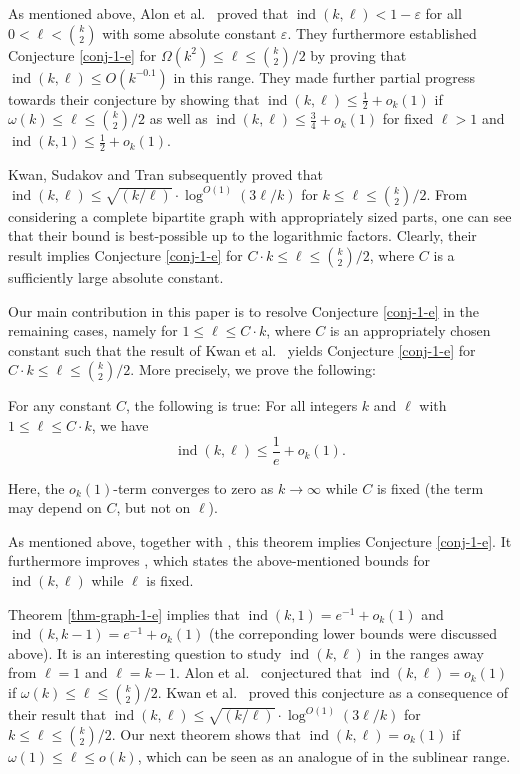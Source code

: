 As mentioned above, Alon et al.\ \cite{alon-et-al} proved that $\operatorname{ind}(k,\ell)<1-\varepsilon$ for all $0< \ell<{k\choose 2}$ with some absolute constant $\varepsilon$. They furthermore established Conjecture \ref{conj-1-e} for $\Omega(k^2)\leq \ell\leq  {k\choose 2}/2$ by proving that $\operatorname{ind}(k,\ell)\leq O(k^{-0.1})$ in this range. They made further partial progress towards their conjecture by showing that $\operatorname{ind}(k,\ell)\leq \frac{1}{2}+o_k(1)$ if $\omega(k)\leq \ell\leq  {k\choose 2}/2$ as well as $\operatorname{ind}(k,\ell)\leq \frac{3}{4}+o_k(1)$ for fixed $\ell>1$ and $\operatorname{ind}(k,1)\leq \frac{1}{2}+o_k(1)$.

Kwan, Sudakov and Tran \cite{kwan-et-al} subsequently proved that $\operatorname{ind}(k,\ell)\leq \sqrt{(k/\ell)}\cdot \log^{O(1)}(3\ell/k)$ for $k\leq \ell\leq  {k\choose 2}/2$. From considering a complete bipartite graph with appropriately sized parts, one can see that their bound is best-possible up to the logarithmic factors. Clearly, their result implies Conjecture \ref{conj-1-e} for $C\cdot k\leq \ell\leq  {k\choose 2}/2$, where $C$ is a sufficiently large absolute constant.

Our main contribution in this paper is to resolve Conjecture \ref{conj-1-e} in the remaining cases, namely for $1\leq \ell\leq C\cdot k$, where $C$ is an appropriately chosen constant such that the result of Kwan et al.\  \cite{kwan-et-al} yields Conjecture \ref{conj-1-e} for $C\cdot k\leq \ell\leq  {k\choose 2}/2$. More precisely, we prove the following:

\begin{theorem}\label{thm-graph-1-e}For any constant $C$, the following is true: For all integers $k$ and $\ell$ with $1\leq \ell\leq C\cdot k$, we have
\[\operatorname{ind}(k,\ell)\leq \frac{1}{e}+o_k(1).\]
\end{theorem}
Here, the $o_k(1)$-term converges to zero as $k\to\infty$ while $C$ is fixed (the term may depend on $C$, but not on $\ell$).

As mentioned above, together with \cite[Theorem 1.1]{kwan-et-al}, this theorem implies Conjecture \ref{conj-1-e}. It furthermore improves \cite[Theorem 1.6]{alon-et-al}, which states the above-mentioned bounds for $\operatorname{ind}(k,\ell)$ while $\ell$ is fixed.

Theorem \ref{thm-graph-1-e} implies that $\operatorname{ind}(k,1)=  e^{-1}+o_k(1)$ and $\operatorname{ind}(k,k-1)=  e^{-1}+o_k(1)$ (the correponding lower bounds were discussed above). It is an interesting question to study $\operatorname{ind}(k,\ell)$ in the ranges away from $\ell=1$ and $\ell=k-1$. Alon et al.\ \cite[Conjecture 6.1]{alon-et-al} conjectured that $\operatorname{ind}(k,\ell)=o_k(1)$ if $\omega(k)\leq \ell\leq {k\choose 2}/2$. Kwan et al.\  \cite{kwan-et-al} proved this conjecture as a consequence of their result that $\operatorname{ind}(k,\ell)\leq \sqrt{(k/\ell)}\cdot \log^{O(1)}(3\ell/k)$ for $k\leq \ell\leq  {k\choose 2}/2$. Our next theorem shows that $\operatorname{ind}(k,\ell)=o_k(1)$ if  $\omega(1)\leq \ell\leq o(k)$, which can be seen as an analogue of \cite[Conjecture 6.1]{alon-et-al} in the sublinear range.

